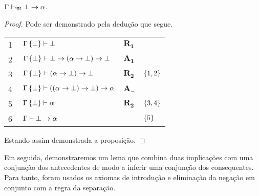 \begin{tcolorbox}[enhanced jigsaw, breakable, sharp corners, colframe=black, colback=white, boxrule=0.5pt, left=1.5mm, right=1.5mm, top=1.5mm, bottom=1.5mm]
\begin{lemma}[Explosão]\label{explosion}
    $\Gamma\mathrel{\vdash}_\mathfrak{M}\bot\to\alpha$.
    \begin{proof}
        Pode ser demonstrado pela dedução que segue.

        \vspace{0.5\baselineskip}
        \footnotesize
        \setlength{\rowskip}{0.5\baselineskip}
        \begin{xltabular}{\textwidth}{r | X l l}
            \scriptsize{\phantom{0}1}\phantom{ } & $\ \Gamma\set{\bot}\entails\bot$                              & $\hyperref[modal.rule.1]{\mathbf{R_1}}$\phantom{1} & \\[\rowskip]
            \scriptsize{\phantom{0}2}\phantom{ } & $\ \Gamma\set{\bot}\entails\bot\to(\alpha\to\bot)\to\bot$     & $\hyperref[modal.axiom.1]{\mathbf{A_1}}$           & \\[\rowskip]
            \scriptsize{\phantom{0}3}\phantom{ } & $\ \Gamma\set{\bot}\entails(\alpha\to\bot)\to\bot$            & $\hyperref[modal.rule.2]{\mathbf{R_2}}$            & $\left\{1,2\right\}$\\[\rowskip]
            \scriptsize{\phantom{0}4}\phantom{ } & $\ \Gamma\set{\bot}\entails((\alpha\to\bot)\to\bot)\to\alpha$ & $\hyperref[modal.axiom.negation]{\mathbf{A_\neg}}$ & \\[\rowskip]
            \scriptsize{\phantom{0}5}\phantom{ } & $\ \Gamma\set{\bot}\entails\alpha$                            & $\hyperref[modal.rule.2]{\mathbf{R_2}}$            & $\left\{3,4\right\}$\\[\rowskip]
            \scriptsize{\phantom{0}6}\phantom{ } & $\ \Gamma\entails\bot\to\alpha$                               &                                & $\left\{5\right\}$\\[\rowskip]
        \end{xltabular}
        \normalsize

        \vspace{0.5\baselineskip}
        Estando assim demonstrada a proposição.
    \end{proof}
\end{lemma}
\end{tcolorbox}

\vspace{.5\baselineskip}
Em seguida, demonstraremos um lema que combina duas implicações com uma conjunção dos antecedentes de modo a inferir uma conjunção dos consequentes.
Para tanto, foram usados os axiomas de introdução e eliminação da negação em conjunto com a regra da separação.

